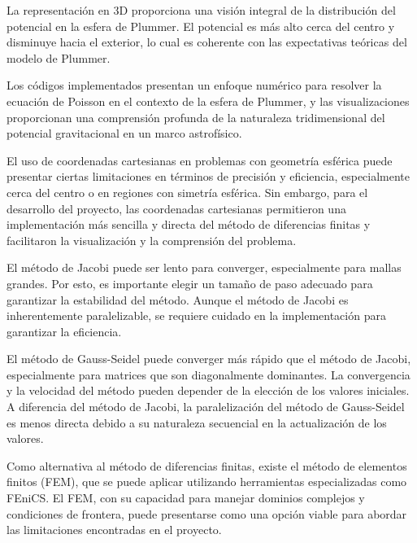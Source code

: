\documentclass[reprint,amsmath,amssymb,aps]{revtex4-2}
\begin{document}
La representación en 3D proporciona una visión integral de la distribución del potencial en la esfera de Plummer. El potencial es más alto cerca del centro y disminuye hacia el exterior, lo cual es coherente con las expectativas teóricas del modelo de Plummer.

Los códigos implementados presentan un enfoque numérico para resolver la ecuación de Poisson en el contexto de la esfera de Plummer, y las visualizaciones proporcionan una comprensión profunda de la naturaleza tridimensional del potencial gravitacional en un marco astrofísico.

El uso de coordenadas cartesianas en problemas con geometría esférica puede presentar ciertas limitaciones en términos de precisión y eficiencia, especialmente cerca del centro o en regiones con simetría esférica. Sin embargo, para el desarrollo del proyecto, las coordenadas cartesianas permitieron una implementación más sencilla y directa del método de diferencias finitas y facilitaron la visualización y la comprensión del problema.

El método de Jacobi puede ser lento para converger, especialmente para mallas grandes. Por esto, es importante elegir un tamaño de paso adecuado para garantizar la estabilidad del método. Aunque el método de Jacobi es inherentemente paralelizable, se requiere cuidado en la implementación para garantizar la eficiencia.

El método de Gauss-Seidel puede converger más rápido que el método de Jacobi, especialmente para matrices que son diagonalmente dominantes. La convergencia y la velocidad del método pueden depender de la elección de los valores iniciales. A diferencia del método de Jacobi, la paralelización del método de Gauss-Seidel es menos directa debido a su naturaleza secuencial en la actualización de los valores.

Como alternativa al método de diferencias finitas, existe el método de elementos finitos (FEM), que se puede aplicar utilizando herramientas especializadas como FEniCS. El FEM, con su capacidad para manejar dominios complejos y condiciones de frontera, puede presentarse como una opción viable para abordar las limitaciones encontradas en el proyecto.



\end{document}
